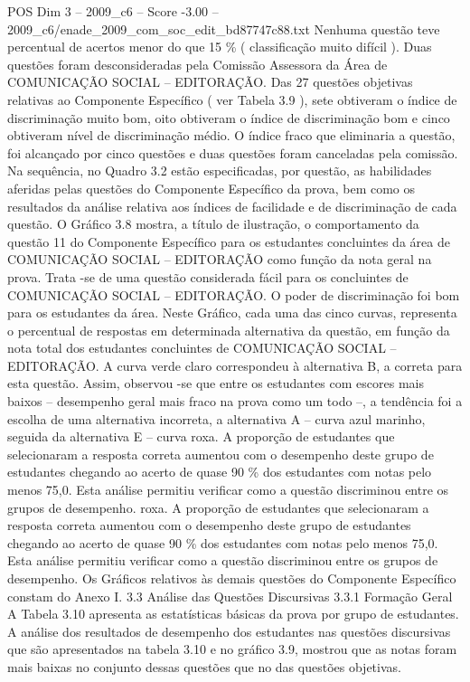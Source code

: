 \begin{textsample}{POS Dim 3 – 2009\_c6 – Score -3.00 – 2009\_c6/enade\_2009\_com\_soc\_edit\_bd87747c88.txt}
Nenhuma questão teve percentual de acertos menor do que 15 \% ( classificação muito difícil ).
Duas questões foram desconsideradas pela Comissão Assessora da Área de COMUNICAÇÃO SOCIAL – EDITORAÇÃO.
Das 27 questões objetivas relativas ao Componente Específico ( ver Tabela 3.9 ), sete obtiveram o índice de discriminação muito bom, oito obtiveram o índice de discriminação bom e cinco obtiveram nível de discriminação médio.
O índice fraco que eliminaria a questão, foi alcançado por cinco questões e duas questões foram canceladas pela comissão.
Na sequência, no Quadro 3.2 estão especificadas, por questão, as habilidades aferidas pelas questões do Componente Específico da prova, bem como os resultados da análise relativa aos índices de facilidade e de discriminação de cada questão.
O Gráfico 3.8 mostra, a título de ilustração, o comportamento da questão 11 do Componente Específico para os estudantes concluintes da área de COMUNICAÇÃO SOCIAL – EDITORAÇÃO como função da nota geral na prova.
Trata -se de uma questão considerada fácil para os concluintes de COMUNICAÇÃO SOCIAL – EDITORAÇÃO.
O poder de discriminação foi bom para os estudantes da área.
Neste Gráfico, cada uma das cinco curvas, representa o percentual de respostas em determinada alternativa da questão, em função da nota total dos estudantes concluintes de COMUNICAÇÃO SOCIAL – EDITORAÇÃO.
A curva verde claro correspondeu à alternativa B, a correta para esta questão.
Assim, observou -se que entre os estudantes com escores mais baixos – desempenho geral mais fraco na prova como um todo –, a tendência foi a escolha de uma alternativa incorreta, a alternativa A – curva azul marinho, seguida da alternativa E – curva roxa.
A proporção de estudantes que selecionaram a resposta correta aumentou com o desempenho deste grupo de estudantes chegando ao acerto de quase 90 \% dos estudantes com notas pelo menos 75,0.
Esta análise permitiu verificar como a questão discriminou entre os grupos de desempenho. roxa.
A proporção de estudantes que selecionaram a resposta correta aumentou com o desempenho deste grupo de estudantes chegando ao acerto de quase 90 \% dos estudantes com notas pelo menos 75,0.
Esta análise permitiu verificar como a questão discriminou entre os grupos de desempenho.
Os Gráficos relativos às demais questões do Componente Específico constam do Anexo I. 3.3 Análise das Questões Discursivas 3.3.1 Formação Geral A Tabela 3.10 apresenta as estatísticas básicas da prova por grupo de estudantes.
A análise dos resultados de desempenho dos estudantes nas questões discursivas que são apresentados na tabela 3.10 e no gráfico 3.9, mostrou que as notas foram mais baixas no conjunto dessas questões que no das questões objetivas.

\end{textsample}
